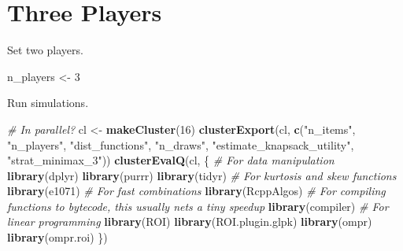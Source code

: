 \documentclass[]{article}
\newenvironment{Shaded}{\begin{snugshade}}{\end{snugshade}}
\newcommand{\KeywordTok}[1]{\textcolor[rgb]{0.13,0.29,0.53}{\textbf{#1}}}
\newcommand{\DecValTok}[1]{\textcolor[rgb]{0.00,0.00,0.81}{#1}}
\newcommand{\StringTok}[1]{\textcolor[rgb]{0.31,0.60,0.02}{#1}}
\newcommand{\CommentTok}[1]{\textcolor[rgb]{0.56,0.35,0.01}{\textit{#1}}}
\newcommand{\NormalTok}[1]{#1}
\begin{document}
\begin{Shaded}
\end{Shaded}

\section{Three Players}\label{three-players}

Set two players.

\begin{Shaded}
\begin{Highlighting}[]
\NormalTok{n_players <-}\StringTok{ }\DecValTok{3}
\end{Highlighting}
\end{Shaded}

Run simulations.

\begin{Shaded}
\begin{Highlighting}[]
\CommentTok{# In parallel?}
\NormalTok{cl <-}\StringTok{ }\KeywordTok{makeCluster}\NormalTok{(}\DecValTok{16}\NormalTok{)}
\KeywordTok{clusterExport}\NormalTok{(cl, }\KeywordTok{c}\NormalTok{(}\StringTok{"n_items"}\NormalTok{, }\StringTok{"n_players"}\NormalTok{, }\StringTok{"dist_functions"}\NormalTok{, }\StringTok{"n_draws"}\NormalTok{, }\StringTok{"estimate_knapsack_utility"}\NormalTok{,}
                    \StringTok{"strat_minimax_3"}\NormalTok{))}
\KeywordTok{clusterEvalQ}\NormalTok{(cl, \{}
  \CommentTok{# For data manipulation}
  \KeywordTok{library}\NormalTok{(dplyr)}
  \KeywordTok{library}\NormalTok{(purrr)}
  \KeywordTok{library}\NormalTok{(tidyr)}
  \CommentTok{# For kurtosis and skew functions}
  \KeywordTok{library}\NormalTok{(e1071)}
  \CommentTok{# For fast combinations}
  \KeywordTok{library}\NormalTok{(RcppAlgos)}
  \CommentTok{# For compiling functions to bytecode, this usually nets a tiny speedup}
  \KeywordTok{library}\NormalTok{(compiler)}
  \CommentTok{# For linear programming}
  \KeywordTok{library}\NormalTok{(ROI)}
  \KeywordTok{library}\NormalTok{(ROI.plugin.glpk)}
  \KeywordTok{library}\NormalTok{(ompr)}
  \KeywordTok{library}\NormalTok{(ompr.roi)}
\NormalTok{\})}
\end{Highlighting}
\end{Shaded}
\end{document}
